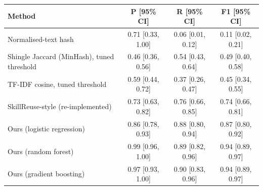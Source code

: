 \begin{tabular}{lccc}
\toprule
Method & P [95\% CI] & R [95\% CI] & F1 [95\% CI] \\
\midrule
Normalised-text hash & 0.71 [0.33, 1.00] & 0.06 [0.01, 0.12] & 0.11 [0.02, 0.21] \\
Shingle Jaccard (MinHash), tuned threshold & 0.46 [0.36, 0.56] & 0.54 [0.43, 0.64] & 0.49 [0.40, 0.58] \\
TF-IDF cosine, tuned threshold & 0.59 [0.44, 0.72] & 0.37 [0.26, 0.47] & 0.45 [0.34, 0.55] \\
SkillReuse-style (re-implemented) & 0.73 [0.63, 0.82] & 0.76 [0.66, 0.85] & 0.74 [0.66, 0.81] \\
\midrule
Ours (logistic regression) & 0.86 [0.78, 0.93] & 0.88 [0.80, 0.94] & 0.87 [0.80, 0.92] \\
Ours (random forest) & 0.99 [0.96, 1.00] & 0.89 [0.82, 0.96] & 0.94 [0.89, 0.97] \\
Ours (gradient boosting) & 0.97 [0.93, 1.00] & 0.90 [0.83, 0.96] & 0.94 [0.89, 0.97] \\
\bottomrule
\end{tabular}
